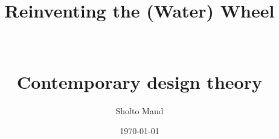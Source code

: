 









\title{Reinventing the (Water) Wheel \\
\\
\\
\small{Contemporary design theory}}
\author{Sholto Maud}
\date{\today}






\maketitle 
\tableofcontents
\listoffigures










